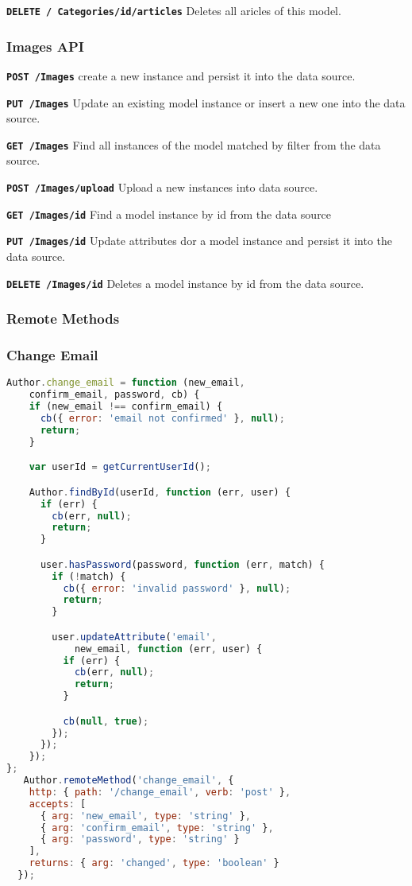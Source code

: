 \texttt{\textbf{DELETE / Categories/{id}/articles}} Deletes all aricles of this model.


\subsubsection{Images API}

\texttt{\textbf{POST /Images}} create a new instance and persist it into the data source.

\texttt{\textbf{PUT /Images}} Update an existing model instance or insert a new one into the data source.

\texttt{\textbf{GET /Images}} Find all instances of the model matched by filter from the data source.

\texttt{\textbf{POST /Images/upload}} Upload a new instances into data source.

\texttt{\textbf{GET /Images/{id}}} Find a model instance by id from the data source

\texttt{\textbf{PUT /Images/{id}}} Update attributes dor a model instance and persist it into the data source.

\texttt{\textbf{DELETE /Images/{id}}} Deletes a model instance by id from the data source.

\subsubsection{Remote Methods}

\subsubsection{Change Email}

\begin{lstlisting}[language=javascript]
Author.change_email = function (new_email, 
	confirm_email, password, cb) {
    if (new_email !== confirm_email) {
      cb({ error: 'email not confirmed' }, null);
      return;
    }

    var userId = getCurrentUserId();  

    Author.findById(userId, function (err, user) {
      if (err) {
        cb(err, null);
        return;
      }

      user.hasPassword(password, function (err, match) {
        if (!match) {
          cb({ error: 'invalid password' }, null);
          return;
        }

        user.updateAttribute('email', 
        	new_email, function (err, user) {
          if (err) {
            cb(err, null);
            return;
          }

          cb(null, true);
        });
	  });       
	});
};
   Author.remoteMethod('change_email', {
    http: { path: '/change_email', verb: 'post' },
    accepts: [
      { arg: 'new_email', type: 'string' },
      { arg: 'confirm_email', type: 'string' },
      { arg: 'password', type: 'string' }
    ],
    returns: { arg: 'changed', type: 'boolean' }
  });
\end{lstlisting}

